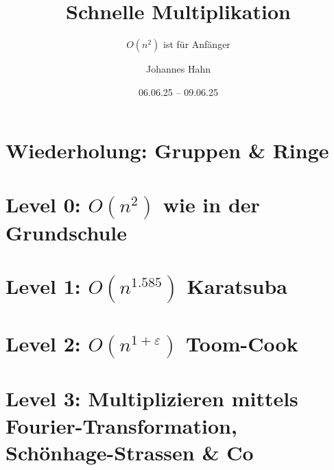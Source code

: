 \documentclass[fontsize=11pt,fleqn,a4paper]{scrartcl}
\author{Johannes Hahn}
\title{Schnelle Multiplikation}
\subtitle{$O(n^2)$ ist für Anfänger}
\date{06.06.25 -- 09.06.25}
\begin{document}
\maketitle

\tableofcontents
\pagebreak

\setcounter{section}{-1}
\section{Wiederholung: Gruppen \& Ringe}\label{algebra}




\pagebreak

\section{Level 0: $O(n^2)$ wie in der Grundschule}\label{slow_multiplication}



\section{Level 1: $O(n^{1.585})$ Karatsuba}



\section{Level 2: $O(n^{1+\varepsilon})$ Toom-Cook}



\section{Level 3: Multiplizieren mittels Fourier-Transformation, Schönhage-Strassen \& Co}




\end{document}
